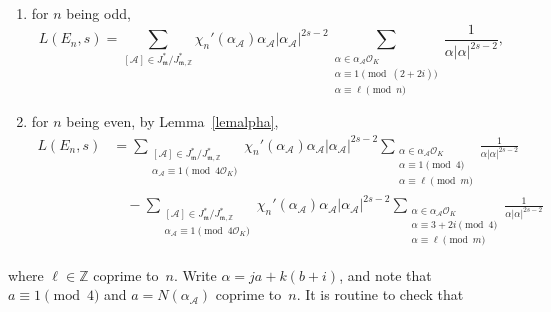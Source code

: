 \documentclass[11pt, reqno]{amsart}
\theoremstyle{plain}
\theoremstyle{definition}
\numberwithin{equation}{section}
\begin{document}
 \begin{enumerate}
     \item for $n$ being odd, 
     $$
     L(E_{n},s)=\sum_{[\mathcal{A}]\in J_{\mathfrak{m}}^{*}/J_{\mathfrak{m},\mathbb{Z}}^{*}}\chi_{n}'(\alpha_{\mathcal{A}})\alpha_{\mathcal{A}}|\alpha_{\mathcal{A}}|^{2s-2}
  \displaystyle{  \sum_{\substack{\alpha\in \alpha_{\mathcal{A}}\mathcal{O}_{K}\\\alpha\equiv1\pmod{(2+2i)}\\\alpha\equiv\ell\pmod{n}}}\frac{1}{\alpha|\alpha|^{2s-2}}},
     $$

     \item  for $n$ being even, by Lemma~\ref{lemalpha},
     \begin{align*}
          L(E_{n},s)&=\sum_{\substack{[\mathcal{A}]\in J_{\mathfrak{m}}^{*}/J_{\mathfrak{m},\mathbb{Z}}^{*}\\\alpha_{\mathcal{A}}\equiv1\pmod{4\mathcal{O}_{K}}}}\chi_{n}'(\alpha_{\mathcal{A}})\alpha_{\mathcal{A}}|\alpha_{\mathcal{A}}|^{2s-2}
   \displaystyle{ \sum_{\substack{\alpha\in \alpha_{\mathcal{A}}\mathcal{O}_{K}\\\alpha\equiv1\pmod{4}\\\alpha\equiv\ell\pmod{m}}}\frac{1}{\alpha|\alpha|^{2s-2}}}\\
   &\quad -\sum_{\substack{[\mathcal{A}]\in J_{\mathfrak{m}}^{*}/J_{\mathfrak{m},\mathbb{Z}}^{*}\\\alpha_{\mathcal{A}}\equiv1\pmod{4\mathcal{O}_{K}}}}\chi_{n}'(\alpha_{\mathcal{A}})\alpha_{\mathcal{A}}|\alpha_{\mathcal{A}}|^{2s-2}
   \displaystyle{ \sum_{\substack{\alpha\in \alpha_{\mathcal{A}}\mathcal{O}_{K}\\\alpha\equiv3+2i\pmod{4}\\\alpha\equiv\ell\pmod{m}}}\frac{1}{\alpha|\alpha|^{2s-2}}}
     \end{align*}
    
 \end{enumerate}
where $\ell\in\mathbb{Z}$ coprime to~$n$.
Write $\alpha=ja+k(b+i)$, and note that $a\equiv1\pmod{4}$ and $a=N(\alpha_{\mathcal{A}})$ coprime to~$n$. It is routine to check that 
\end{document}

